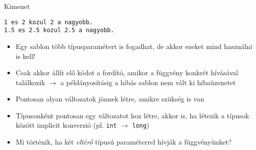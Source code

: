 \documentclass[usenames,dvipsnames,aspectratio=169]{beamer}
\begin{document}
\begin{frame}[fragile]
    \begin{exampleblock}{}
        \vspace{-.2cm}
        \scriptsize
        
        \vspace{-.2cm}
    \end{exampleblock}
    \begin{block}{Kimenet}
        \vspace{-.4cm}
        \scriptsize
        \begin{verbatim}
1 es 2 kozul 2 a nagyobb.
1.5 es 2.5 kozul 2.5 a nagyobb.
\end{verbatim}             
        \vspace{-.4cm}
    \end{block}
\end{frame}

\begin{frame}
    \begin{exampleblock}{}
        \scriptsize
        
    \end{exampleblock}
\end{frame}

\begin{frame}
    \begin{itemize}
        \item Egy sablon több típusparamétert is fogadhat, de akkor ezeket mind használni is kell!
        \item Csak akkor állít elő kódot a fordító, amikor a függvény konkrét hívásával találkozik $\to$ a példányosításig a hibás sablon nem vált ki hibaüzenetet
        \item Pontosan olyan változatok jönnek létre, amikre szükség is van
        \item Típusonként pontosan egy változatot hoz létre, akkor is, ha létezik a típusok között implicit konverzió (pl. \texttt{int} $\to$ \texttt{long})
        \item Mi történik, ha két \emph{eltérő} típusú paraméterrel hívják a függvényünket?
    \end{itemize}
\end{frame}

\begin{frame}
    \begin{exampleblock}{}
        \scriptsize
        
    \end{exampleblock}
\end{frame}
\end{document}

